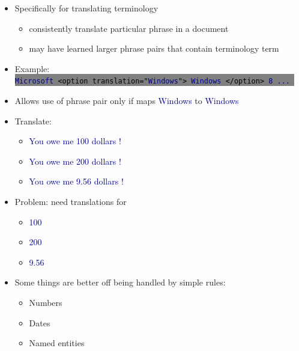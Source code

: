 \documentclass[landscape]{uedslides2C}
\newcommand{\example}[1]{\textcolor{darkblue}{\rm #1}}
\newcommand{\littlecode}[1]{\colorbox{gray}{\textcolor{black}{\small \tt #1}}}
\begin{document}

\vspace{1cm}
\begin{itemize}
\item Specifically for translating terminology
\begin{itemize} 
  \item consistently translate particular phrase in a document
  \item may have learned larger phrase pairs that contain terminology term
\end{itemize} 

\item Example: \\[4mm]
\littlecode{\example{Microsoft} <option translation="\example{Windows}"> \example{Windows}
  </option> \example{8 ...} }

\item Allows use of phrase pair only if maps \example{Windows} to  \example{Windows}
\end{itemize}


\begin{itemize} \itemsep -2mm
\item Translate:
\begin{itemize} \vspace{-2mm}
  \item \example{You owe me 100 dollars !}
  \item \example{You owe me 200 dollars !}
  \item \example{You owe me 9.56 dollars !}
\end{itemize}
\item Problem: need translations for
\begin{itemize} \vspace{-2mm}
  \item \example{100}
  \item \example{200}
  \item \example{9.56}
\end{itemize}
\item Some things are better off being handled by simple rules:
\begin{itemize} \vspace{-2mm}
  \item Numbers
  \item Dates
  \item Named entities
\end{itemize}
\end{itemize}
\end{document}
